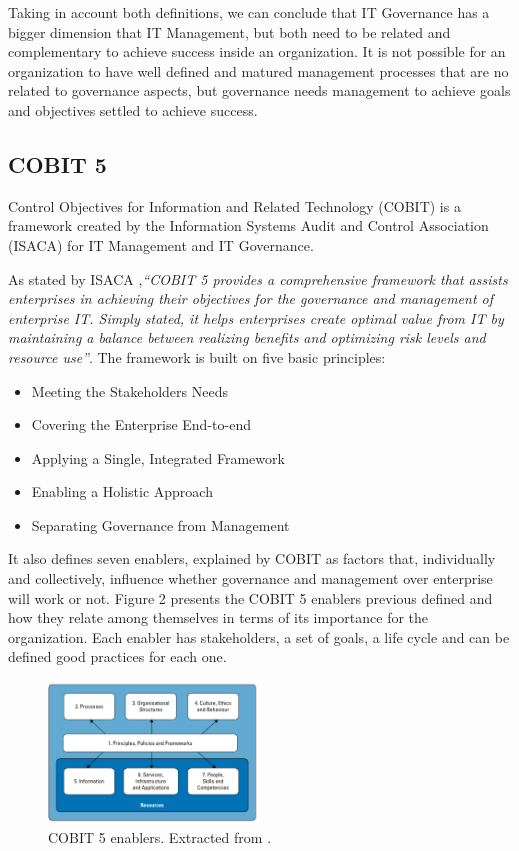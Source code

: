 Taking in account both definitions, we can conclude that IT Governance has a bigger dimension that IT Management, but both need to be related and complementary to achieve success inside an organization. It is not possible for an organization to have well defined and matured management processes that are no related to governance aspects, but governance needs management to achieve goals and objectives settled to achieve success.

\subsection{COBIT 5}

Control Objectives for Information and Related Technology (COBIT) is a framework created by the Information Systems Audit and Control Association (ISACA) for IT Management and IT Governance.\par
As stated by ISACA \cite{2012cobit},\textit{``COBIT 5 provides a comprehensive framework that assists enterprises in achieving their objectives for the governance and management of enterprise IT. Simply stated, it helps enterprises create optimal value from IT by maintaining a balance between realizing benefits and optimizing risk levels and resource use''}. The framework is built on five basic principles:

\begin{itemize}
  \item Meeting the Stakeholders Needs 
  \item Covering the Enterprise End-to-end
  \item Applying a Single, Integrated Framework
  \item Enabling a Holistic Approach
  \item Separating Governance from Management
\end{itemize}


It also defines seven enablers, explained by COBIT as factors that, individually and collectively, influence whether governance and management over enterprise will work or not. Figure 2 presents the COBIT 5 enablers previous defined and how they relate among themselves in terms of its importance for the organization. Each enabler has stakeholders, a set of goals, a life cycle and can be defined good practices for each one.\par

\begin{figure}
\centering
\includegraphics[width=0.5\textwidth]{img/Enablers.png}
\caption{COBIT 5 enablers. Extracted from \cite{2012cobit}.}
\end{figure}



